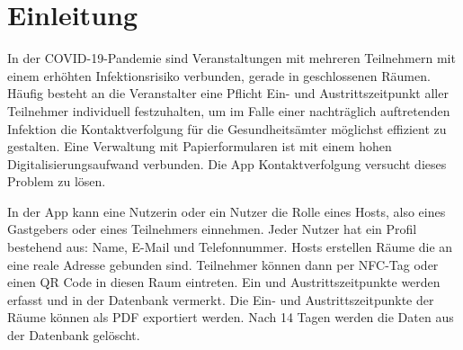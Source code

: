 \sloppy
\section{Einleitung}
\label{sec:Einleitung}
In der COVID-19-Pandemie sind Veranstaltungen mit mehreren Teilnehmern mit einem erhöhten Infektionsrisiko verbunden, gerade in geschlossenen Räumen.
Häufig besteht an die Veranstalter eine Pflicht Ein- und Austrittszeitpunkt aller Teilnehmer individuell festzuhalten, um im Falle einer nachträglich auftretenden Infektion die Kontaktverfolgung für die Gesundheitsämter möglichst effizient zu gestalten.
Eine Verwaltung mit Papierformularen ist mit einem hohen Digitalisierungsaufwand verbunden.
Die App Kontaktverfolgung versucht dieses Problem zu lösen.

In der App kann eine Nutzerin oder ein Nutzer die Rolle eines Hosts, also eines Gastgebers oder eines Teilnehmers einnehmen.
 Jeder Nutzer hat ein Profil bestehend aus: Name, E-Mail und Telefonnummer.
Hosts erstellen Räume die an eine reale Adresse gebunden sind. Teilnehmer können dann per NFC-Tag oder einen QR Code in diesen Raum eintreten. Ein und Austrittszeitpunkte werden erfasst und in der Datenbank vermerkt.
Die Ein- und Austrittszeitpunkte der Räume können als PDF exportiert werden.
Nach 14 Tagen werden die Daten aus der Datenbank gelöscht. 
